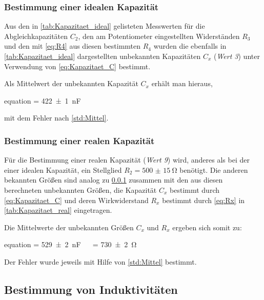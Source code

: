 	\subsubsection{Bestimmung einer idealen Kapazität}
	\label{sec:Auswertung_Kapazität_ideal}
		Aus den in \cref{tab:Kapazitaet_ideal} gelisteten Messwerten für die Abgleichkapazitäten
		$C_{2}$, den am Potentiometer eingestellten Widerständen $R_{3}$ und den mit \cref{eq:R4} 
		aus diesen bestimmten $R_{4}$ wurden die ebenfalls in \cref*{tab:Kapazitaet_ideal} dargestellten
		unbekannten Kapazitäten $C_{x}$ (\emph{Wert 3}) unter Verwendung von \cref{eq:Kapazitaet_C} bestimmt. 
		
			
	
		Als Mittelwert der unbekannten Kapazität $C_{x}$ erhält man hieraus,
		\begin{empheq}{equation}
			 = \SI{422(1)}{\nano\farad}
		\end{empheq} 
		mit dem Fehler nach \cref{std:Mittel}.
		
	\subsubsection{Bestimmung einer realen Kapazität}
	\label{sec:Auswertung_Kapazität_real}
		
		Für die Bestimmung einer realen Kapazität (\emph{Wert 9}) wird, anderes als bei der einer idealen Kapazität, ein
		Stellglied $R_{2} = \SI{500(15)}{\ohm}$ benötigt. Die anderen bekannten Größen sind analog zu
		 \cref{sec:Auswertung_Kapazität_ideal} zusammen mit den aus diesen 
		berechneten unbekannten Größen, die Kapazität $C_{x}$ bestimmt durch \cref{eq:Kapazitaet_C} und deren
		 Wirkwiderstand $R_{x}$ bestimmt durch \cref{eq:Rx} in 
		\cref{tab:Kapazitaet_real} eingetragen. 
	
		

		Die Mittelwerte der unbekannten Größen $C_{x}$ und $R_{x}$ ergeben sich somit zu:
		\begin{empheq}{equation}
				 = \SI{529(2)}{\nano\farad} \quad\ \ \quad {} = \SI{730(2)}{\ohm}
		\end{empheq}  
		Der Fehler wurde jeweils mit Hilfe von \cref{std:Mittel} bestimmt.
\subsection{Bestimmung von Induktivitäten}
\label{sec:Auswertung_Induktivität}

